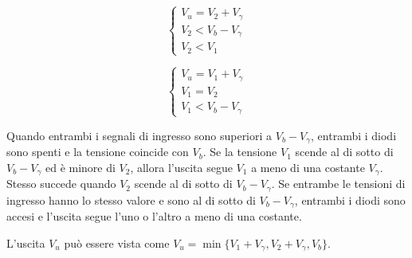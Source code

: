 \documentclass[../elettronica]{subfiles}
\begin{document}
\begin{minipage}[b]{.45\textwidth}
    \begin{tcolorbox}[title=D1 OFF e D2 ON]
        \[\begin{cases}
            V_u = V_2 + V_\gamma\\
            V_2 < V_b - V_\gamma\\
            V_2 < V_1
        \end{cases}\]
    \end{tcolorbox}
\end{minipage}
\begin{minipage}[b]{.45\textwidth}
    \begin{tcolorbox}[title=D1 e D2 ON]
        \[\begin{cases}
            V_u = V_1 + V_\gamma\\
            V_1 = V_2\\
            V_1 < V_b - V_\gamma
        \end{cases}\]
    \end{tcolorbox}
\end{minipage}

Quando entrambi i segnali di ingresso sono superiori a $V_b - V_\gamma$, entrambi i diodi sono spenti e la tensione coincide con $V_b$.
Se la tensione $V_1$ scende al di sotto di $V_b - V_\gamma$ ed è minore di $V_2$, allora l'uscita segue $V_1$ a meno di una
costante $V_\gamma$.
Stesso succede quando $V_2$ scende al di sotto di $V_b - V_\gamma$.
Se entrambe le tensioni di ingresso hanno lo stesso valore e sono al di sotto di $V_b - V_\gamma$, entrambi i diodi sono accesi
e l'uscita segue l'uno o l'altro a meno di una costante.

L'uscita $V_u$ può essere vista come $V_u = \min\big\{V_1 + V_\gamma, V_2 + V_\gamma, V_b\big\}$.

\begin{figure}[h]
    \centering
    \begin{minipage}[b]{.45\textwidth}
    \end{minipage}
    \begin{minipage}[b]{.45\textwidth}
    \end{minipage}
\end{figure}
\end{document}
